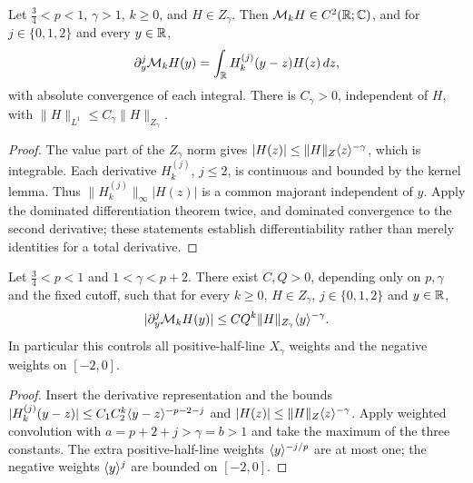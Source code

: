 \begin{lemma}
  \label{lem:c08_Mk_differentiation}
  Let $\frac34<p<1$, $\gamma>1$, $k\ge0$, and $H\in Z_\gamma$.
  Then $\mathcal{M}_kH\in C^2(\mathbb{R};\mathbb{C})$, and for $j\in\{0,1,2\}$ and every $y\in\mathbb{R}$,
  \[
    \partial_y^j\mathcal{M}_kH(y)=\int_{\mathbb{R}} H_k^{(j)}(y-z)H(z)\,dz,
  \]
  with absolute convergence of each integral. There is $C_\gamma>0$, independent of $H$, with
  $\|H\|_{L^1}\le C_\gamma\|H\|_{Z_\gamma}$.
\end{lemma}
\begin{proof}
  The value part of the $Z_\gamma$ norm gives $|H(z)|\le\|H\|_Z\langle z \rangle^{-\gamma}$, which is integrable.
  Each derivative $H_k^{(j)}$, $j\le2$, is continuous and bounded by the kernel lemma.
  Thus $\|H_k^{(j)}\|_\infty|H(z)|$ is a common majorant independent of $y$.
  Apply the dominated differentiation theorem twice, and dominated convergence to the second
  derivative; these statements establish differentiability rather than merely identities for a total derivative.
\end{proof}

\begin{lemma}
  \label{lem:c08_Mk_global_decay}
  Let $\frac34<p<1$ and $1<\gamma<p+2$. There exist $C,Q>0$, depending only on $p,\gamma$ and the fixed
  cutoff, such that for every $k\ge0$, $H\in Z_\gamma$, $j\in\{0,1,2\}$ and $y\in\mathbb{R}$,
  \[
    |\partial_y^j\mathcal{M}_kH(y)|\le C Q^k\|H\|_{Z_\gamma}\langle y \rangle^{-\gamma}.
  \]
  In particular this controls all positive-half-line $X_\gamma$ weights and the negative weights on $[-2,0]$.
\end{lemma}
\begin{proof}
  Insert the derivative representation and the bounds
  $|H_k^{(j)}(y-z)|\le C_1C_2^k\langle y-z \rangle^{-p-2-j}$ and $|H(z)|\le\|H\|_Z\langle z \rangle^{-\gamma}$.
  Apply weighted convolution with $a=p+2+j>\gamma=b>1$ and take the maximum of the three constants.
  The extra positive-half-line weights $\langle y \rangle^{-j/p}$ are at most one; the negative weights
  $\langle y \rangle^j$ are bounded on $[-2,0]$.
\end{proof}

